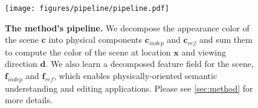 \begin{figure}[t!]
\centering
\texttt{[image: figures/pipeline/pipeline.pdf]}
\vspace{-0.7cm}
\caption{\textbf{The method's pipeline.} We decompose the appearance color of the scene $\mathbf{c}$ into physical components $\mathbf{c}_{indep}$ and $\mathbf{c}_{ref}$ and sum them to compute the color of the scene at location $\mathbf{x}$ and viewing direction $\mathbf{d}$. We also learn a decomposed feature field for the scene, $\mathbf{f}_{indep}$ and $\mathbf{f}_{ref}$, which enables physically-oriented semantic understanding and editing applications. Please see \cref{sec:method} for more details.
} 
\label{fig:pipeline}
\vspace{-0.3cm}
\end{figure}
